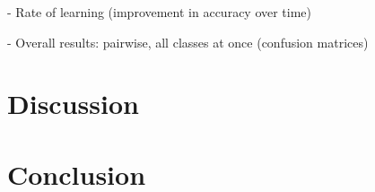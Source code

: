 \documentclass[11pt]{article}
\begin{document}
\begin{multicols}{2}
- Rate of learning (improvement in accuracy over time)

- Overall results: pairwise, all classes at once (confusion matrices)









\section{Discussion}








\section{Conclusion}












\end{multicols}
\end{document}
